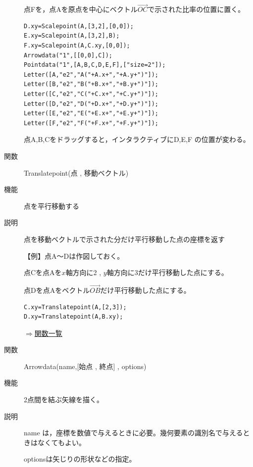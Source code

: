 \documentclass[papersize,a4paper,12pt,uplatex]{jsarticle}
\begin{document}
\begin{description}
点Fを，点Aを原点を中心にベクトル$\overrightarrow{OC} $で示された比率の位置に置く。
\begin{verbatim}
D.xy=Scalepoint(A,[3,2],[0,0]);
E.xy=Scalepoint(A,[3,2],B);
F.xy=Scalepoint(A,C.xy,[0,0]);
Arrowdata("1",[[0,0],C]);
Pointdata("1",[A,B,C,D,E,F],["size=2"]);
Letter([A,"e2","A("+A.x+","+A.y+")"]);
Letter([B,"e2","B("+B.x+","+B.y+")"]);
Letter([C,"e2","C("+C.x+","+C.y+")"]);
Letter([D,"e2","D("+D.x+","+D.y+")"]);
Letter([E,"e2","E("+E.x+","+E.y+")"]);
Letter([F,"e2","F("+F.x+","+F.y+")"]);
\end{verbatim}
\vspace{\baselineskip}
\begin{center}  \end{center}

点A,B,Cをドラッグすると，インタラクティブにD,E,F の位置が変わる。

\vspace{\baselineskip}
\hypertarget{translatepoint}{}
\item[関数]Translatepoint(点 , 移動ベクトル)
\item[機能]点を平行移動する
\item[説明]点を移動ベクトルで示された分だけ平行移動した点の座標を返す

\vspace{\baselineskip}
【例】点A〜Dは作図しておく。

点Cを点Aを$x$軸方向に2 , $y$軸方向に3だけ平行移動した点にする。

点Dを点Aをベクトル$\overrightarrow{OB} $だけ平行移動した点にする。
\begin{verbatim}
C.xy=Translatepoint(A,[2,3]);
D.xy=Translatepoint(A,B.xy);
\end{verbatim}

\hspace{20mm} \scalebox{0.9}{}

\begin{flushright}\hyperlink{functionlist}{$\Rightarrow$関数一覧}\end{flushright}

\hypertarget{arrowdata}{}
\item[関数]Arrowdata(name,[始点 , 終点] , options) 
\item[機能]2点間を結ぶ矢線を描く。
\item[説明]name は，座標を数値で与えるときに必要。幾何要素の識別名で与えるときはなくてもよい。

optionsは矢じりの形状などの指定。


\end{description}
\end{document}
